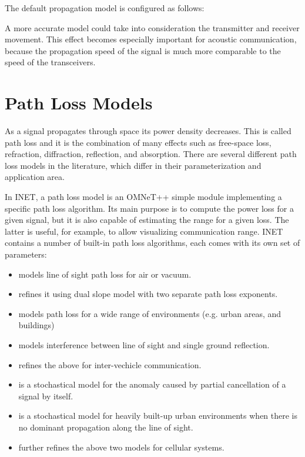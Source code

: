 The default propagation model is configured as follows:


A more accurate model could take into consideration the transmitter and
receiver movement. This effect becomes especially important for acoustic
communication, because the propagation speed of the signal is much more
comparable to the speed of the transceivers.

\section{Path Loss Models}
\label{sec:medium:path-loss-models}

As a signal propagates through space its power density decreases. This is
called path loss and it is the combination of many effects such as
free-space loss, refraction, diffraction, reflection, and absorption. There
are several different path loss models in the literature, which differ in
their parameterization and application area.

In INET, a path loss model is an OMNeT++ simple module implementing a
specific path loss algorithm. Its main purpose is to compute the power loss
for a given signal, but it is also capable of estimating the range for a
given loss. The latter is useful, for example, to allow visualizing
communication range. INET contains a number of built-in path loss
algorithms, each comes with its own set of parameters:

\begin{itemize}
        \item {} models line of sight path loss for air or vacuum.
        \item {} refines it using dual slope model with two separate path loss exponents.
        \item {} models path loss for a wide range of environments (e.g. urban areas, and buildings)
        \item {} models interference between line of sight and single ground reflection.
        \item {} refines the above for inter-vechicle communication.
        \item {} is a stochastical model for the anomaly caused by partial cancellation of a signal by itself.
        \item {} is a stochastical model for heavily built-up urban environments when there is no dominant propagation along the line of sight.
        \item {} further refines the above two models for cellular systems.
\end{itemize}


